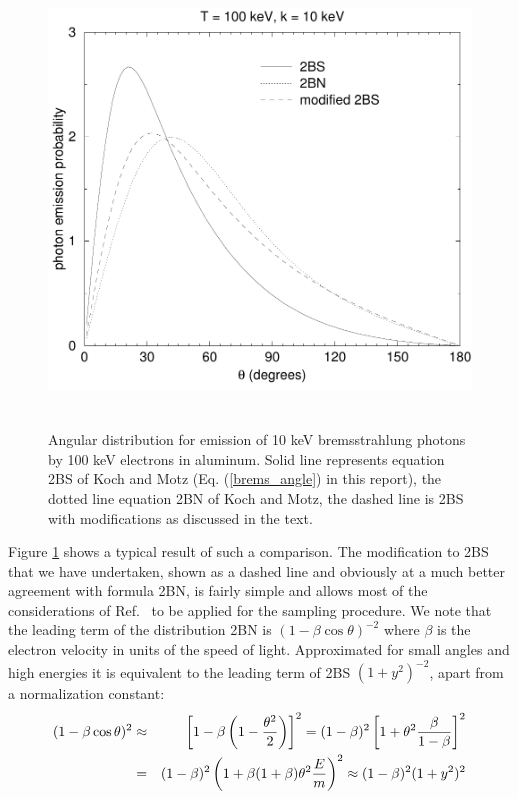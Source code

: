 \begin{figure}[htp]
\includegraphics[height=12cm,width=12cm]{figures/bremang1}
\caption[Low energy bremsstrahlung angular distribution]{\label{brems_angle_fig1}
Angular distribution for emission of 10 keV bremsstrahlung photons
by 100 keV electrons in aluminum. Solid line represents
equation 2BS of Koch and Motz (Eq. (\ref{brems_angle}) in this
report), the dotted line equation 2BN of Koch and Motz, the
dashed line is 2BS with modifications as discussed in the text.}
\end{figure}
Figure \ref{brems_angle_fig1} shows a typical result of such
a comparison. The modification to 2BS that we have undertaken,
shown as a dashed line and obviously at a much better
agreement with formula 2BN,
is fairly simple and allows most of the considerations of
Ref.~\cite{Bi89} to be applied for the sampling procedure.
We note that the leading term of the distribution
2BN is $(1 - \beta \cos \theta)^{-2}$ where $\beta$ is the
electron velocity in units of the speed of light.
Approximated for
small angles and high energies it is equivalent to
the leading term of 2BS $(1 + y^2)^{-2}$, apart from a
normalization constant:
\begin{eqnarray}
(1 - \beta \cos \theta)^2 & \approx &
\left[1 - \beta\left(1 - \frac{\theta^2}{2}\right)\right]^2 =
(1 - \beta)^2 \left[ 1 + \theta^2 {\beta \over 1 - \beta} \right]^2
\nonumber \\
& = & (1 - \beta)^2 \left(1 + \beta (1 + \beta) \theta^2 \frac{E}{m} \right)^2
\approx (1 - \beta)^2 (1 + y^2)^2
\end{eqnarray}

